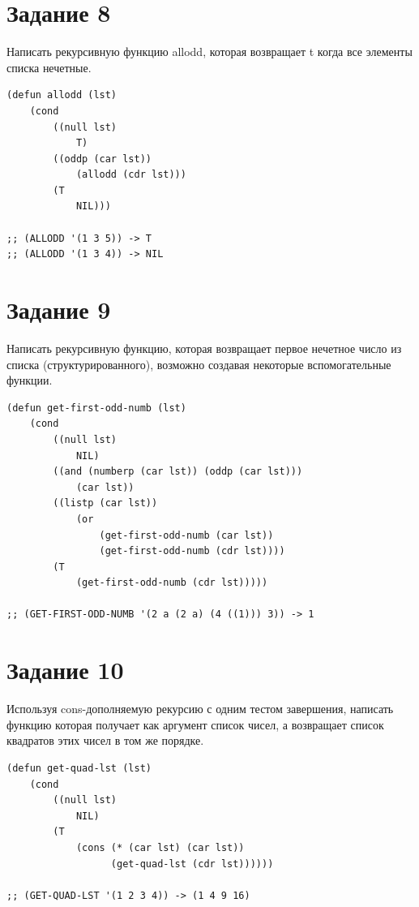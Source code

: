 \documentclass[a4paper,14pt, unknownkeysallowed]{extreport}
\begin{document}
\clearpage

\section{Задание 8}

Написать рекурсивную функцию allodd, которая возвращает t когда все элементы списка нечетные.

\begin{center}
\captionsetup{justification=raggedright,singlelinecheck=off}
\begin{lstlisting}[label=lst:parallel_processing,caption=Решение задания 8]
(defun allodd (lst)
    (cond 
        ((null lst)
            T)
        ((oddp (car lst))
            (allodd (cdr lst)))
        (T
            NIL)))

;; (ALLODD '(1 3 5)) -> T
;; (ALLODD '(1 3 4)) -> NIL

\end{lstlisting}
\end{center}

\section{Задание 9}

Написать рекурсивную функцию, которая возвращает первое нечетное число из списка (структурированного), возможно создавая некоторые вспомогательные функции.

\begin{center}
\captionsetup{justification=raggedright,singlelinecheck=off}
\begin{lstlisting}[label=lst:parallel_processing,caption=Решение задания 9]
(defun get-first-odd-numb (lst)
    (cond  
        ((null lst)
            NIL)
        ((and (numberp (car lst)) (oddp (car lst)))
            (car lst))
        ((listp (car lst))
            (or 
                (get-first-odd-numb (car lst))
                (get-first-odd-numb (cdr lst))))
        (T 
            (get-first-odd-numb (cdr lst)))))

;; (GET-FIRST-ODD-NUMB '(2 a (2 a) (4 ((1))) 3)) -> 1
\end{lstlisting}
\end{center}

\section{Задание 10}

Используя cons-дополняемую рекурсию с одним тестом завершения, написать функцию которая получает как аргумент список чисел, а возвращает список квадратов этих чисел в том же порядке.

\begin{center}
\captionsetup{justification=raggedright,singlelinecheck=off}
\begin{lstlisting}[label=lst:parallel_processing,caption=Решение задания 10]
(defun get-quad-lst (lst)
    (cond
        ((null lst)
            NIL)
        (T
            (cons (* (car lst) (car lst))
                  (get-quad-lst (cdr lst))))))

;; (GET-QUAD-LST '(1 2 3 4)) -> (1 4 9 16)
\end{lstlisting}
\end{center}
\end{document}
